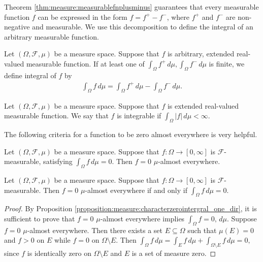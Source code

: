 Theorem \ref{thm:measure:measurablefnplusminus} guarantees that every measurable function $f$ can be expressed in the form
$f = f^{+} - f^{-}$, where $f^{+}$ and $f^{-}$ are non-negative and measurable.  We use this decomposition to define the integral of an arbitrary measurable function.

\begin{definition}
Let $(\Omega, \mathcal{F}, \mu)$ be a measure space. Suppose that $f$ is arbitrary, extended real-valued measurable function.
If at least one of $ \int_{\Omega} f^{+} \,d\mu, \int_{\Omega} f^{-} \,d\mu$ is finite, we define integral of $f$ by
\begin{align*}
        \int_{\Omega} f \,d\mu = \int_{\Omega} f^{+} \,d\mu - \int_{\Omega} f^{-} \,d\mu.
\end{align*}
\end{definition}

\begin{definition}
Let $(\Omega, \mathcal{F}, \mu)$ be a measure space. Suppose that $f$ is extended real-valued measurable function. We say that $f$ is integrable if $\int_\Omega |f| \, d\mu < \infty$.
\end{definition}

The following criteria for a function to be zero almost everywhere is very helpful.

\begin{proposition}
\label{proposition:measure:characterzerointergral_one_dir}
Let $(\Omega, \mathcal{F}, \mu)$ be a measure space. Suppose that $f : \Omega \to [0, \infty]$ is $\mathcal{F}$-measurable,
satisfying $\int_{\Omega} f \, d\mu = 0$. Then $f = 0$ $\mu$-almost everywhere. 
\end{proposition}

\begin{proposition}
\label{proposition:measure:characterzerointergral_two_dir}
Let $(\Omega, \mathcal{F}, \mu)$ be a measure space. Suppose that $f : \Omega \to [0, \infty]$ is $\mathcal{F}$-measurable.
Then $f = 0$ $\mu$-almost everywhere if and only if $\int_{\Omega} f \, d\mu = 0$. 
\end{proposition}
\begin{proof}
By Proposition \ref{proposition:measure:characterzerointergral_one_dir}, it is sufficient to prove that $f = 0$ $\mu$-almost everywhere implies $\int_\Omega f = 0, \, d\mu$.
Suppose $f = 0$ $\mu$-almost everywhere. Then there exists a set $E \subseteq \Omega$ such that $\mu(E) = 0$ and $f > 0$ on $E$ while $f = 0$ on $\Omega \setminus E$. Then $\int_\Omega f \, d\mu = \int_E f \, d\mu + \int_{\Omega \setminus E} f \, d\mu = 0, $
since $f$ is identically zero on $\Omega \setminus E$ and $E$ is a set of measure zero.
\end{proof}

